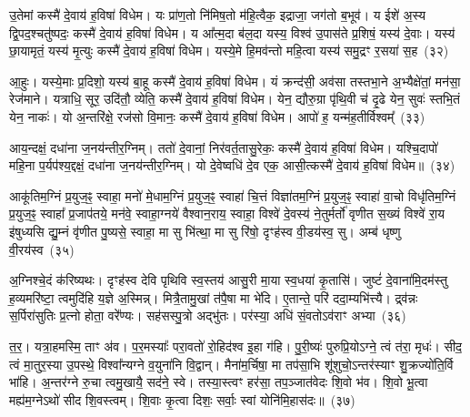 उ॒तेमां कस्मै॑ दे॒वाय॑ ह॒विषा॑ विधेम। यः प्रा॑ण॒तो नि॑मिष॒तो म॑हि॒त्वैक॒ इद्राजा॒ जग॑तो ब॒भूव॑। य ईशे॑ अ॒स्य द्वि॒पद॒श्चतु॑ष्पदः॒ कस्मै॑ दे॒वाय॑ ह॒विषा॑ विधेम। य आ᳚त्म॒दा ब॑ल॒दा यस्य॒ विश्व॑ उ॒पास॑ते प्र॒शिषं॒ यस्य॑ दे॒वाः। यस्य॑ छा॒यामृतं॒ यस्य॑ मृ॒त्युः कस्मै॑ दे॒वाय॑ ह॒विषा॑ विधेम। यस्ये॒मे हि॒मव॑न्तो महि॒त्वा यस्य॑ समु॒द्रꣳ र॒सया॑ स॒ह~(३२)

आ॒हुः। यस्ये॒माः प्र॒दिशो॒ यस्य॑ बा॒हू कस्मै॑ दे॒वाय॑ ह॒विषा॑ विधेम। यं क्रन्द॑सी॒ अव॑सा तस्तभा॒ने अ॒भ्यैक्षे॑तां॒ मन॑सा॒ रेज॑माने। यत्राधि॒ सूर॒ उदि॑तौ॒ व्येति॒ कस्मै॑ दे॒वाय॑ ह॒विषा॑ विधेम। येन॒ द्यौरु॒ग्रा पृ॑थि॒वी च॑ दृ॒ढे येन॒ सुवः॑ स्तभि॒तं येन॒ नाकः॑। यो अ॒न्तरि॑क्षे॒ रज॑सो वि॒मानः॒ कस्मै॑ दे॒वाय॑ ह॒विषा॑ विधेम। आपो॑ ह॒ यन्म॑ह॒तीर्विश्वम्᳚~(३३)

आय॒न्दक्षं॒ दधा॑ना ज॒नय॑न्तीर॒ग्निम्। ततो॑ दे॒वानां॒ निर॑वर्त॒तासु॒रेकः॒ कस्मै॑ दे॒वाय॑ ह॒विषा॑ विधेम। यश्चि॒दापो॑ महि॒ना प॒र्यप॑श्य॒द्दक्षं॒ दधा॑ना ज॒नय॑न्तीर॒ग्निम्। यो दे॒वेष्वधि॑ दे॒व एक॒ आसी॒त्कस्मै॑ दे॒वाय॑ ह॒विषा॑ विधेम॥~(३४)

{\anuvakamend[{अ॒ग्नेः स सर॑स्वती॒ द्याꣳ स॒ह विश्व॒ञ्चतु॑स्त्रिHꣳशश्च}]}%

आकू॑तिम॒ग्निं प्र॒युज॒ꣴ॒ स्वाहा॒ मनो॑ मे॒धाम॒ग्निं प्र॒युज॒ꣴ॒ स्वाहा॑ चि॒त्तं विज्ञा॑तम॒ग्निं प्र॒युज॒ꣴ॒ स्वाहा॑ वा॒चो विधृ॑तिम॒ग्निं प्र॒युज॒ꣴ॒ स्वाहा᳚ प्र॒जा\-प॑तये॒ मन॑वे॒ स्वाहा॒ग्नये॑ वैश्वान॒राय॒ स्वाहा॒ विश्वे॑ दे॒वस्य॑ ने॒तुर्मर्तो॑ वृणीत स॒ख्यं विश्वे॑ रा॒य इ॑षुध्यसि द्यु॒म्नं वृ॑णीत पु॒ष्यसे॒ स्वाहा॒ मा सु भि॑त्था॒ मा सु रि॑षो॒ दृꣳह॑स्व वी॒डय॑स्व॒ सु। अम्ब॑ धृष्णु वी॒रय॑स्व~(३५)

अ॒ग्निश्चे॒दं क॑रिष्यथः। दृꣳह॑स्व देवि पृथिवि स्व॒स्तय॑ आसु॒री मा॒या स्व॒धया॑ कृ॒तासि॑। जुष्टं॑ दे॒वाना॑मि॒दम॑स्तु ह॒व्यमरि॑ष्टा॒ त्वमुदि॑हि य॒ज्ञे अ॒स्मिन्न्। मित्रै॒तामु॒खां त॑पै॒षा मा भे॑दि। ए॒तान्ते॒ परि॑ ददा॒म्यभि॑त्त्यै। द्र्व॑न्नः स॒र्पिरा॑सुतिः प्र॒त्नो होता॒ वरे᳚ण्यः। सह॑सस्पु॒त्रो अद्भु॑तः। पर॑स्या॒ अधि॑ सं॒वतो\-ऽव॑राꣳ अभ्या~(३६)

त॒र॒। यत्रा॒हमस्मि॒ ताꣳ अ॑व। प॒र॒मस्याः᳚ परा॒वतो॑ रो॒हिद॑श्व इ॒हा ग॑हि। पु॒री॒ष्यः॑ पुरुप्रि॒यो\-ऽग्ने॒ त्वं त॑रा॒ मृधः॑। सीद॒ त्वं मा॒तुर॒स्या उ॒पस्थे॒ विश्वा᳚न्यग्ने व॒युना॑नि वि॒द्वान्। मैना॑म॒र्चिषा॒ मा तप॑सा॒भि शू॑शुचो॒\-ऽन्तर॑स्याꣳ शु॒क्रज्यो॑ति॒र्वि भा॑हि। अ॒न्तर॑ग्ने रु॒चा त्वमु॒खायै॒ सद॑ने॒ स्वे। तस्या॒स्त्वꣳ हर॑सा॒ तप॒ञ्जात॑वेदः शि॒वो भ॑व। शि॒वो भू॒त्वा मह्य॑म॒ग्ने\-ऽथो॑ सीद शि॒वस्त्वम्। शि॒वाः कृ॒त्वा दिशः॒ सर्वाः॒ स्वां योनि॑मि॒हास॑दः॥~(३७)

{\anuvakamend[{वी॒रय॒स्वा तप॑न्विꣳश॒तिश्च॑}]}%

